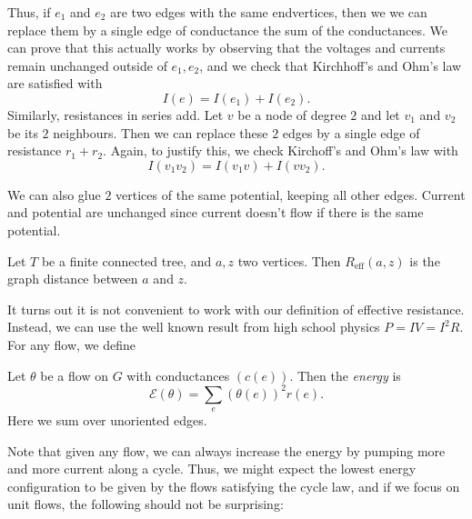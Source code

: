 \documentclass[a4paper]{article}
\begin{document}
Thus, if $e_1$ and $e_2$ are two edges with the same endvertices, then we we can replace them by a single edge of conductance the sum of the conductances. We can prove that this actually works by observing that the voltages and currents remain unchanged outside of $e_1, e_2$, and we check that Kirchhoff's and Ohm's law are satisfied with
\[
  I(e) = I(e_1) + I(e_2).
\]
Similarly, resistances in series add. Let $v$ be a node of degree $2$ and let $v_1$ and $v_2$ be its $2$ neighbours. Then we can replace these $2$ edges by a single edge of resistance $r_1 + r_2$. Again, to justify this, we check Kirchoff's and Ohm's law with
\[
  I(v_1 v_2) = I(v_1 v) + I(vv_2).
\]
\begin{center}
\end{center}

We can also glue $2$ vertices of the same potential, keeping all other edges. Current and potential are unchanged since current doesn't flow if there is the same potential.

\begin{ex}
  Let $T$ be a finite connected tree, and $a, z$ two vertices. Then $R_{\mathrm{eff}}(a, z)$ is the graph distance between $a$ and $z$.
\end{ex}

It turns out it is not convenient to work with our definition of effective resistance. Instead, we can use the well known result from high school physics $P = IV = I^2 R$. For any flow, we define

\begin{defi}[Energy]
  Let $\theta$ be a flow on $G$ with conductances $(c(e))$. Then the \emph{energy} is
  \[
    \mathcal{E}(\theta) = \sum_e (\theta(e))^2 r(e).
  \]
  Here we sum over unoriented edges.
\end{defi}
Note that given any flow, we can always increase the energy by pumping more and more current along a cycle. Thus, we might expect the lowest energy configuration to be given by the flows satisfying the cycle law, and if we focus on unit flows, the following should not be surprising:
\end{document}
